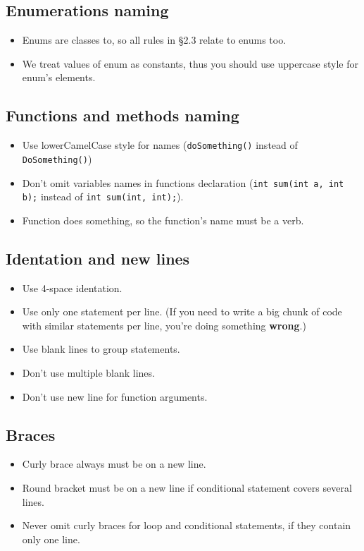 \documentclass[12pt]{article}
\newcommand{\code}[1]{\colorbox{verylightgray}{\lstinline!#1!}}
\begin{document}
		\subsection{Enumerations naming}
			\begin{itemize}
				\item Enums are classes to, so all rules in \S2.3 relate to enums too.
				\item We treat values of enum as constants, thus you should use uppercase style for enum's elements.
			\end{itemize}

		\subsection{Functions and methods naming}
			\begin{itemize}
				\item Use lowerCamelCase style for names (\code{doSomething()} instead of \code{DoSomething()})
				\item Don't omit variables names in functions declaration (\code{int sum(int a, int b);} instead of \code{int sum(int, int);}).
				\item Function does something, so the function's name must be a verb.
			\end{itemize}

		\subsection{Identation and new lines}
			\begin{itemize}
				\item Use 4-space identation.
				\item Use only one statement per line. (If you need to write a big chunk of code with similar statements per line, you're doing something \textbf{wrong}.)
				\item Use blank lines to group statements.
				\item Don't use multiple blank lines.
				\item Don't use new line for function arguments.
			\end{itemize}

		\subsection{Braces}
			\begin{itemize}
				\item Curly brace always must be on a new line.
				\item Round bracket must be on a new line if conditional statement covers several lines.
				\item Never omit curly braces for loop and conditional statements, if they contain only one line.
			\end{itemize}
\end{document}
